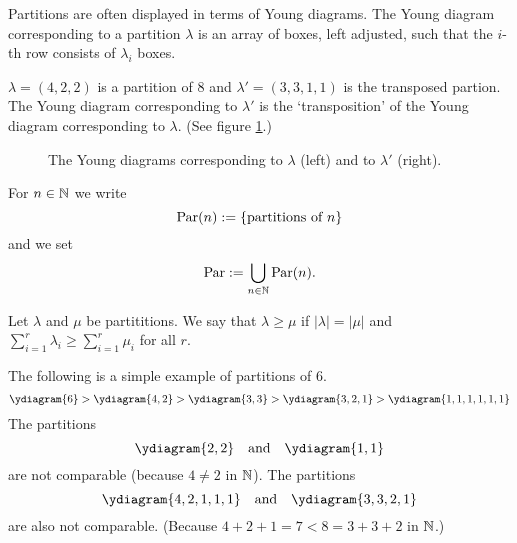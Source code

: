 Partitions are often displayed in terms of Young diagrams. The Young diagram corresponding to a partition $\lambda$ is an array of boxes, left adjusted, such that the $i$-th row consists of $\lambda_i$ boxes.


\begin{expl}
 $\lambda = (4,2,2)$ is a partition of $8$ and $\lambda' = (3,3,1,1)$ is the transposed partion. The Young diagram corresponding to $\lambda'$ is the `transposition' of the Young diagram corresponding to $\lambda$. (See figure \ref{fig: Young diagram example}.)
 \begin{figure}
  \centering
  \qquad
  \caption{The Young diagrams corresponding to $\lambda$ (left) and to $\lambda'$ (right).}
  \label{fig: Young diagram example}
 \end{figure}
\end{expl}


\begin{defi}
 For $n \in \mathbb{N}$ we write
 \[
  \operatorname{Par}(n) := \{\text{partitions of $n$}\}
 \]
 and we set
 \[
  \operatorname{Par} := \bigcup_{n \in \mathbb{N}} \operatorname{Par}(n).
 \]
\end{defi}
 

\begin{defi}
 Let $\lambda$ and $\mu$ be partititions. We say that $\lambda \geq \mu$ if $|\lambda| = |\mu|$ and $\sum_{i=1}^r \lambda_i \geq \sum_{i=1}^r \mu_i$ for all $r$.
\end{defi}


\begin{expls}
 The following is a simple example of partitions of $6$.
 \[
  \ydiagram{6} > \ydiagram{4,2} > \ydiagram{3,3} > \ydiagram{3,2,1} > \ydiagram{1,1,1,1,1,1}
 \]
 The partitions
 \[
  \ydiagram{2,2} \quad \text{and} \quad \ydiagram{1,1}
 \]
 are not comparable (because $4 \neq 2$ in $\mathbb{N}$). The partitions
 \[
  \ydiagram{4,2,1,1,1} \quad \text{and} \quad \ydiagram{3,3,2,1}
 \]
 are also not comparable. (Because $4+2+1 = 7 < 8 = 3+3+2$ in $\mathbb{N}$.)
\end{expls}


